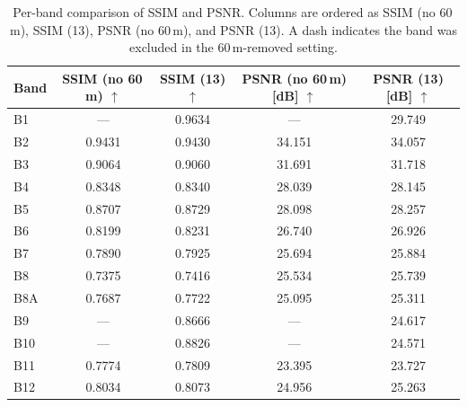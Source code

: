 \begin{table}[h!]
    \centering
    \setlength{\tabcolsep}{6pt}
    \renewcommand{\arraystretch}{1.15}
    \caption[Per-band performance when excluding 60m bands]{Per-band comparison of SSIM and PSNR. Columns are ordered as SSIM (no 60\,m), SSIM (13), PSNR (no 60\,m), and PSNR (13). A dash indicates the band was excluded in the 60\,m-removed setting.}
    \label{tab:ablation_excluding_60m_per_band}
    \begin{tabular}{lcccc}
        \hline
        Band & SSIM (no 60\,m) $\uparrow$ & SSIM (13) $\uparrow$ & PSNR (no 60\,m) [dB] $\uparrow$ & PSNR (13) [dB] $\uparrow$ \\
        \hline
        B1   & ---    & 0.9634 & ---    & 29.749 \\
        B2   & 0.9431 & 0.9430 & 34.151 & 34.057 \\
        B3   & 0.9064 & 0.9060 & 31.691 & 31.718 \\
        B4   & 0.8348 & 0.8340 & 28.039 & 28.145 \\
        B5   & 0.8707 & 0.8729 & 28.098 & 28.257 \\
        B6   & 0.8199 & 0.8231 & 26.740 & 26.926 \\
        B7   & 0.7890 & 0.7925 & 25.694 & 25.884 \\
        B8   & 0.7375 & 0.7416 & 25.534 & 25.739 \\
        B8A  & 0.7687 & 0.7722 & 25.095 & 25.311 \\
        B9   & ---    & 0.8666 & ---    & 24.617 \\
        B10  & ---    & 0.8826 & ---    & 24.571 \\
        B11  & 0.7774 & 0.7809 & 23.395 & 23.727 \\
        B12  & 0.8034 & 0.8073 & 24.956 & 25.263 \\
        \hline
    \end{tabular}
\end{table}

